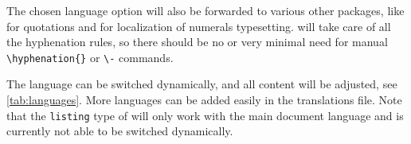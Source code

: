 The chosen language option will also be forwarded to various other packages, like
 for quotations and  for localization of
numerals typesetting.
 will take care of all the hyphenation rules, so there
should be no or very minimal need for manual \verb|\hyphenation{}| or \verb|\-|
commands.

The language can be switched dynamically, and all content will be adjusted, see
\cref{tab:languages}.
More languages can be added easily in the translations file.
Note that the \verb|listing| type of  will only work with
the main document language and is currently not able to be switched dynamically.
\begin{table}
\end{table}
